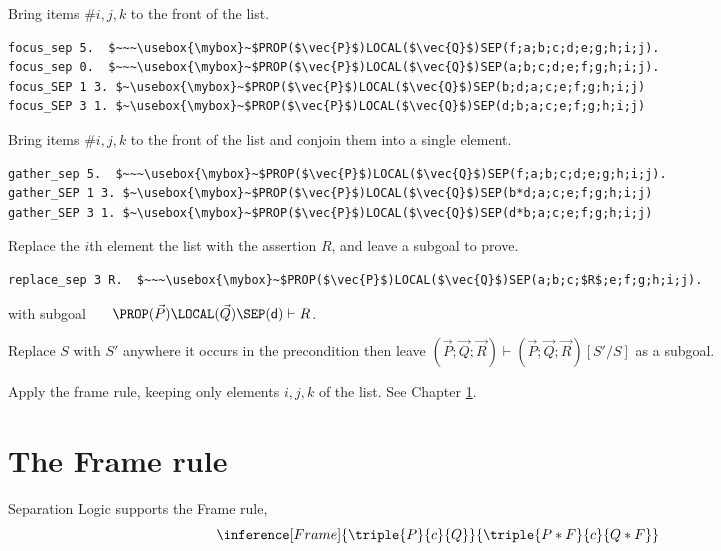 \documentclass[12pt,fleqn,openany,oneside,showtrims]{memoir}
\newcommand{\ychapter}[2]{\chapter[#1]{#1 \hfill \normalsize #2}}
\begin{document}
\begin{description}\setlength{\itemsep}{2ex}
\item[$\mathsf{focus\_SEP}~i~j~k$.]
Bring items \#$i,j,k$ to the front of the \SEP{} list.
\begin{lstlisting}
focus_sep 5.  $~~~\usebox{\mybox}~$PROP($\vec{P}$)LOCAL($\vec{Q}$)SEP(f;a;b;c;d;e;g;h;i;j).
focus_sep 0.  $~~~\usebox{\mybox}~$PROP($\vec{P}$)LOCAL($\vec{Q}$)SEP(a;b;c;d;e;f;g;h;i;j).
focus_SEP 1 3. $~\usebox{\mybox}~$PROP($\vec{P}$)LOCAL($\vec{Q}$)SEP(b;d;a;c;e;f;g;h;i;j)
focus_SEP 3 1. $~\usebox{\mybox}~$PROP($\vec{P}$)LOCAL($\vec{Q}$)SEP(d;b;a;c;e;f;g;h;i;j)
\end{lstlisting}
\item[$\mathsf{gather\_SEP}~i~j~k$.]
Bring items \#$i,j,k$ to the front of the \SEP{} list
and conjoin them into a single element.
\begin{lstlisting}
gather_sep 5.  $~~~\usebox{\mybox}~$PROP($\vec{P}$)LOCAL($\vec{Q}$)SEP(f;a;b;c;d;e;g;h;i;j).
gather_SEP 1 3. $~\usebox{\mybox}~$PROP($\vec{P}$)LOCAL($\vec{Q}$)SEP(b*d;a;c;e;f;g;h;i;j)
gather_SEP 3 1. $~\usebox{\mybox}~$PROP($\vec{P}$)LOCAL($\vec{Q}$)SEP(d*b;a;c;e;f;g;h;i;j)
\end{lstlisting}
\item[$\mathsf{replace\_SEP}~i~R$.]
Replace the $i$th element the \SEP{} list
with the assertion $R$, and leave a subgoal to prove.
\begin{lstlisting}
replace_sep 3 R.  $~~~\usebox{\mybox}~$PROP($\vec{P}$)LOCAL($\vec{Q}$)SEP(a;b;c;$R$;e;f;g;h;i;j).
\end{lstlisting}
with subgoal~~~ $\PROP(\vec{P})\LOCAL(\vec{Q})\SEP(\textsf{d}) \vdash R$.
\item[$\mathsf{replace\_in\_pre}~S~S'$.]
Replace $S$ with $S'$ anywhere it occurs in the precondition
then leave 
$(\vec{P};\vec{Q};\vec{R}) \vdash (\vec{P};\vec{Q};\vec{R})[S'/S]$
as a subgoal.
\item[$\mathsf{frame\_SEP}~i~j~k.$]
Apply the frame rule, keeping only
elements $i,j,k$ of the \SEP{} list.  See Chapter \ref{refcard:frame}.
\end{description}

\ychapter{The Frame rule}{}
\label{refcard:frame}

Separation Logic supports the Frame rule,
\[\inference[Frame]{\triple{P}{c}{Q}}{\triple{P*F}{c}{Q*F}}\]
\end{document}
